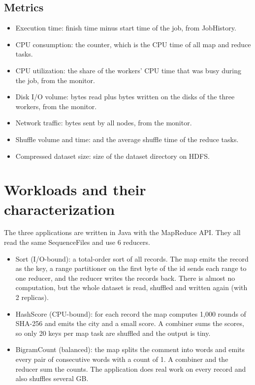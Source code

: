 \documentclass[11pt,a4paper]{article}
\begin{document}
\subsection{Metrics}
\begin{itemize}
  \item Execution time: finish time minus start time of the job, from JobHistory.
  \item CPU consumption: the  counter, which is the CPU time of all map and reduce tasks.
  \item CPU utilization: the share of the workers' CPU time that was busy during the job, from the monitor.
  \item Disk I/O volume: bytes read plus bytes written on the disks of the three workers, from the monitor.
  \item Network traffic: bytes sent by all nodes, from the monitor.
  \item Shuffle volume and time:  and the average shuffle time of the reduce tasks.
  \item Compressed dataset size: size of the dataset directory on HDFS.
\end{itemize}

\section{Workloads and their characterization}
The three applications are written in Java with the MapReduce API. They all read the same SequenceFiles and use 6 reducers.

\begin{itemize}
  \item Sort (I/O-bound): a total-order sort of all records. The map emits the record as the key, a range partitioner on the first byte of the id sends each range to one reducer, and the reducer writes the records back. There is almost no computation, but the whole dataset is read, shuffled and written again (with 2 replicas).
  \item HashScore (CPU-bound): for each record the map computes 1,000 rounds of SHA-256 and emits the city and a small score. A combiner sums the scores, so only 20 keys per map task are shuffled and the output is tiny.
  \item BigramCount (balanced): the map splits the comment into words and emits every pair of consecutive words with a count of 1. A combiner and the reducer sum the counts. The application does real work on every record and also shuffles several GB.
\end{itemize}
\end{document}
